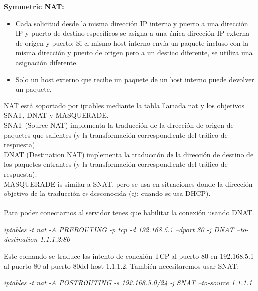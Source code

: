 \documentclass{article}
\begin{document}
\vspace{\baselineskip}
{\fontsize{14pt}{16.8pt}\selectfont \textbf{Symmetric NAT:}\par}\par

\begin{itemize}
	\item {Cada solicitud desde la misma dirección IP interna y puerto a una dirección IP y puerto de destino específicos se asigna a una única dirección IP externa de origen y puerto; Si el mismo host interno envía un paquete incluso con la misma dirección y puerto de origen pero a un destino diferente, se utiliza una asignación diferente.}\par
	
	
	\vspace{\baselineskip}
	\item {Solo un host externo que recibe un paquete de un host interno puede devolver un paquete.}
\end{itemize}\par

NAT está soportado por iptables mediante la tabla llamada nat y los objetivos SNAT, DNAT y MASQUERADE. \\
SNAT (Source NAT) implementa la traducción de la dirección de origen de paquetes que salientes (y la transformación correspondiente del tráfico de respuesta).\\
DNAT (Destination NAT) implementa la traducción de la dirección de destino de los paquetes entrantes (y la transformación correspondiente del tráfico de respuesta).\\
MASQUERADE is similar a SNAT, pero se usa en situaciones donde la dirección objetivo de la traducción es desconocida (ej: cuando se usa DHCP).\\
\\
Para poder conectarnos al servidor tenes que habilitar la conexión usando DNAT.

\begin{center}
	\textit{iptables -t nat -A PREROUTING -p tcp -d 192.168.5.1 --dport 80 -j DNAT --to-destination 1.1.1.2:80}
\end{center}

Este comando se traduce los intento de conexión TCP al puerto 80 en 192.168.5.1 al puerto 80 al puerto 80del host 1.1.1.2.
También necesitaremos usar SNAT:

\begin{center}
	\textit{iptables -t nat -A POSTROUTING -s 192.168.5.0/24 -j SNAT --to-source 1.1.1.1}
\end{center}
\end{document}
